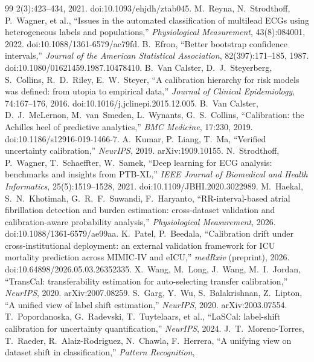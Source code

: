 \documentclass[review,12pt,nonatbib]{elsarticle}
\begin{document}
\begin{thebibliography}{99}
2(3):423--434, 2021. doi:10.1093/ehjdh/ztab045.
 M.~Reyna, N.~Strodthoff, P.~Wagner, et al.,
``Issues in the automated classification of multilead ECGs using
heterogeneous labels and populations,'' \emph{Physiological
Measurement}, 43(8):084001, 2022. doi:10.1088/1361-6579/ac79fd.
 B.~Efron, ``Better bootstrap confidence
intervals,'' \emph{Journal of the American Statistical Association},
82(397):171--185, 1987. doi:10.1080/01621459.1987.10478410.
 B.~Van Calster, D.~J.~Steyerberg,
S.~Collins, R.~D.~Riley, E.~W.~Steyer, ``A calibration hierarchy for
risk models was defined: from utopia to empirical data,''
\emph{Journal of Clinical Epidemiology}, 74:167--176, 2016.
doi:10.1016/j.jclinepi.2015.12.005.
 B.~Van Calster, D.~J.~McLernon,
M.~van~Smeden, L.~Wynants, G.~S.~Collins, ``Calibration: the Achilles
heel of predictive analytics,'' \emph{BMC Medicine}, 17:230, 2019.
doi:10.1186/s12916-019-1466-7.
 A.~Kumar, P.~Liang, T.~Ma, ``Verified uncertainty
calibration,'' \emph{NeurIPS}, 2019. arXiv:1909.10155.
 N.~Strodthoff, P.~Wagner, T.~Schaeffter,
W.~Samek, ``Deep learning for ECG analysis: benchmarks and insights
from PTB-XL,'' \emph{IEEE Journal of Biomedical and Health
Informatics}, 25(5):1519--1528, 2021.
doi:10.1109/JBHI.2020.3022989.
 M.~Haekal, S.~N.~Khotimah,
G.~R.~F.~Suwandi, F.~Haryanto, ``RR-interval-based atrial fibrillation
detection and burden estimation: cross-dataset validation and
calibration-aware probability analysis,'' \emph{Physiological
Measurement}, 2026. doi:10.1088/1361-6579/ae99aa.
 K.~Patel, P.~Beedala, ``Calibration drift under
cross-institutional deployment: an external validation framework for
ICU mortality prediction across MIMIC-IV and eICU,'' \emph{medRxiv}
(preprint), 2026. doi:10.64898/2026.05.03.26352335.
 X.~Wang, M.~Long, J.~Wang, M.~I.~Jordan,
``TransCal: transferability estimation for auto-selecting transfer
calibration,'' \emph{NeurIPS}, 2020. arXiv:2007.08259.
 S.~Garg, Y.~Wu, S.~Balakrishnan, Z.~Lipton,
``A unified view of label shift estimation,'' \emph{NeurIPS}, 2020.
arXiv:2003.07554.
 T.~Popordanoska, G.~Radevski, T.~Tuytelaars, et al.,
``LaSCal: label-shift calibration for uncertainty quantification,''
\emph{NeurIPS}, 2024.
 J.~T.~Moreno-Torres, T.~Raeder,
R.~Alaiz-Rodriguez, N.~Chawla, F.~Herrera, ``A unifying view on
dataset shift in classification,'' \emph{Pattern Recognition},

\end{thebibliography}
\end{document}
